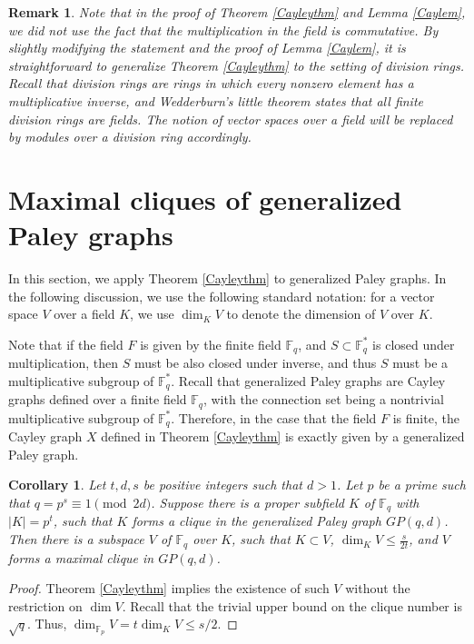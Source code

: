 \documentclass[12pt,oneside]{amsart}
\newtheorem{cor}[thm]{Corollary}
\newtheorem{rem}[thm]{Remark}
\newcommand{\F}{\mathbb{F}}
\begin{document}
\begin{rem}
Note that in the proof of Theorem \ref{Cayleythm} and Lemma \ref{Caylem}, we did not use the fact that the multiplication in the field is commutative. By slightly modifying the statement and the proof of Lemma \ref{Caylem}, it is straightforward to generalize Theorem \ref{Cayleythm} to the setting of division rings. Recall that division rings are rings in which every nonzero element has a multiplicative inverse, and Wedderburn's little theorem states that all finite division rings are fields. The notion of vector spaces over a field will be replaced by modules over a division ring accordingly. 
\end{rem}

\section{Maximal cliques of generalized Paley graphs}

In this section, we apply Theorem \ref{Cayleythm} to generalized Paley graphs. In the following discussion, we use the following standard notation: for a vector space $V$ over a field $K$, we use $\operatorname{dim}_{K} V$ to denote the dimension of $V$ over $K$.

Note that if the field $F$ is given by the finite field $\F_q$, and $S \subset \F_q^*$ is closed under multiplication, then $S$ must be also closed under inverse, and thus $S$ must be a multiplicative subgroup of $\F_q^*$. Recall that generalized Paley graphs are Cayley graphs defined over a finite field $\F_q$, with the connection set being a nontrivial multiplicative subgroup of $\F_q^*$. Therefore, in the case that the field $F$ is finite, the Cayley graph $X$ defined in Theorem \ref{Cayleythm} is exactly given by a generalized Paley graph.

\begin{cor}\label{corGP}
Let $t,d,s$ be positive integers such that $d>1$. Let $p$ be a prime such that $q=p^s \equiv 1 \pmod {2d}$. Suppose there is a proper subfield $K$ of $\F_q$ with $|K|=p^t$, such that $K$ forms a clique in the generalized Paley graph $GP(q,d)$. Then there is a subspace $V$ of $\F_q$ over $K$, such that $K \subset V$, $\operatorname{dim}_{K} V \leq \frac{s}{2t}$, and $V$ forms a maximal clique in $GP(q,d)$. 
\end{cor}

\begin{proof}
Theorem \ref{Cayleythm} implies the existence of such $V$ without the restriction on $\operatorname{dim} V$. Recall that the trivial upper bound on the clique number is $\sqrt{q}$. Thus, $\operatorname{dim}_{\F_p} V= t\operatorname{dim}_K V \leq s/2$.
\end{proof}
\end{document}

